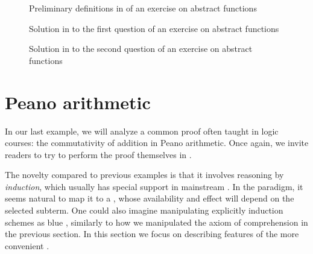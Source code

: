 \begin{figure}
  
  \caption{Preliminary definitions in  of an exercise on abstract functions}
\end{figure}

\begin{figure}
  
  \caption{Solution in  to the first question of an exercise on abstract functions}
\end{figure}

\begin{figure}
  
  \caption{Solution in  to the second question of an exercise on abstract functions}
\end{figure}


\section{Peano arithmetic}

In our last example, we will analyze a common proof often taught in logic
courses: the commutativity of addition in Peano arithmetic. Once again, we
invite readers to try to perform the proof themselves in
.

\AP The novelty compared to previous examples is that it involves reasoning by
\emph{induction}, which usually has special support in mainstream . In the  paradigm, it seems natural to map it to a
 , whose availability and effect will
depend on the selected subterm. One could also imagine manipulating explicitly
induction schemes as blue , similarly to how we manipulated the axiom
of comprehension in the previous section. In this section we focus on describing
features of the more convenient .

